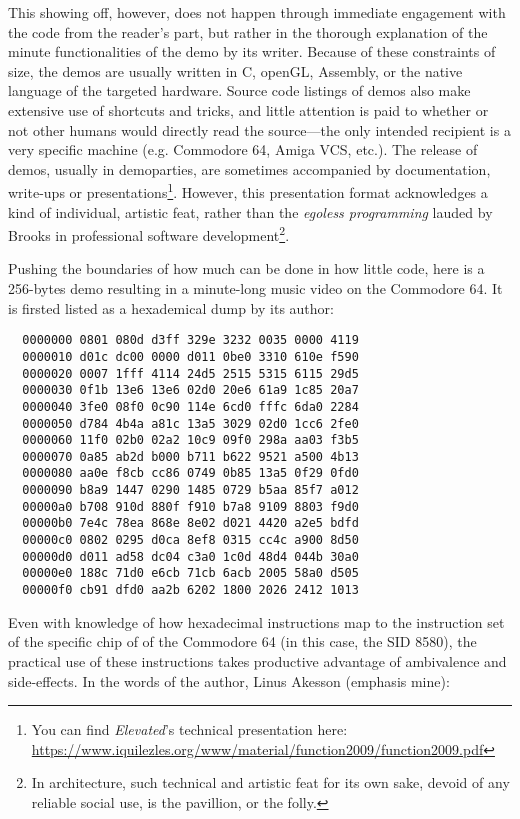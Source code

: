 This showing off, however, does not happen through immediate engagement with the code from the reader's part, but rather in the thorough explanation of the minute functionalities of the demo by its writer. Because of these constraints of size, the demos are usually written in C, openGL, Assembly, or the native language of the targeted hardware. Source code listings of demos also make extensive use of shortcuts and tricks, and little attention is paid to whether or not other humans would directly read the source—the only intended recipient is a very specific machine (e.g. Commodore 64, Amiga VCS, etc.). The release of demos, usually in demoparties, are sometimes accompanied by documentation, write-ups or presentations\footnote{You can find \emph{Elevated}'s technical presentation here: \url{https://www.iquilezles.org/www/material/function2009/function2009.pdf}}. However, this presentation format acknowledges a kind of individual, artistic feat, rather than the \emph{egoless programming} lauded by Brooks in professional software development\footnote{In architecture, such technical and artistic feat for its own sake, devoid of any reliable social use, is the pavillion, or the folly.}.

Pushing the boundaries of how much can be done in how little code, here is a 256-bytes demo resulting in a minute-long music video\cite{akesson_mind_2017} on the Commodore 64. It is firsted listed as a hexademical dump by its author:

\begin{lstlisting}
  0000000 0801 080d d3ff 329e 3232 0035 0000 4119
  0000010 d01c dc00 0000 d011 0be0 3310 610e f590
  0000020 0007 1fff 4114 24d5 2515 5315 6115 29d5
  0000030 0f1b 13e6 13e6 02d0 20e6 61a9 1c85 20a7
  0000040 3fe0 08f0 0c90 114e 6cd0 fffc 6da0 2284
  0000050 d784 4b4a a81c 13a5 3029 02d0 1cc6 2fe0
  0000060 11f0 02b0 02a2 10c9 09f0 298a aa03 f3b5
  0000070 0a85 ab2d b000 b711 b622 9521 a500 4b13
  0000080 aa0e f8cb cc86 0749 0b85 13a5 0f29 0fd0
  0000090 b8a9 1447 0290 1485 0729 b5aa 85f7 a012
  00000a0 b708 910d 880f f910 b7a8 9109 8803 f9d0
  00000b0 7e4c 78ea 868e 8e02 d021 4420 a2e5 bdfd
  00000c0 0802 0295 d0ca 8ef8 0315 cc4c a900 8d50
  00000d0 d011 ad58 dc04 c3a0 1c0d 48d4 044b 30a0
  00000e0 188c 71d0 e6cb 71cb 6acb 2005 58a0 d505
  00000f0 cb91 dfd0 aa2b 6202 1800 2026 2412 1013
\end{lstlisting}

Even with knowledge of how hexadecimal instructions map to the instruction set of the specific chip of of the Commodore 64 (in this case, the SID 8580), the practical use of these instructions takes productive advantage of ambivalence and side-effects. In the words of the author, Linus Akesson (emphasis mine):

